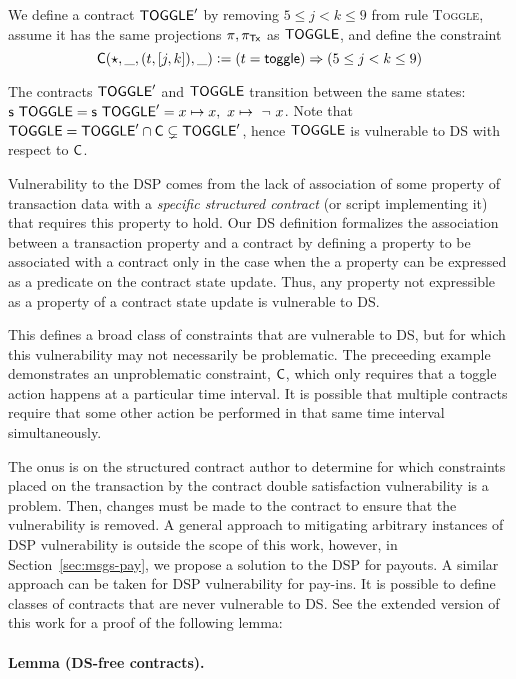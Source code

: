 We define a contract $\mathsf{TOGGLE}'$ by removing $5 \leq j < k \leq 9$ from rule \textsc{Toggle},
assume it has the same projections $\pi, \pi_{\mathsf{Tx}}$ as $\mathsf{TOGGLE}$,
and define the constraint
\[ \mathsf{C} (\star, \_, (t, [j,k]), \_) \mathrel{\mathop:}= (t = \mathsf{toggle}) \Rightarrow (5 \leq j < k \leq 9) \]

The contracts $\mathsf{TOGGLE}'$ and $\mathsf{TOGGLE}$ transition between the same states:
$\mathsf{s}~\mathsf{TOGGLE} = \mathsf{s}~\mathsf{TOGGLE}' = {x \mapsto x,\ x \mapsto ~\neg~x}$.
Note that $\mathsf{TOGGLE} = \mathsf{TOGGLE}' \cap \mathsf{C} \subsetneq \mathsf{TOGGLE}'$, hence
$\mathsf{TOGGLE}$ is vulnerable to DS with respect to $\mathsf{C}$.

Vulnerability to the DSP comes from the lack of association of some property of
transaction data with a \emph{specific structured
contract} (or script implementing it) that requires this property to hold.
Our DS definition formalizes the association between a transaction property and a
contract by defining a property to be associated with a contract only in the case
when the a property can be expressed as a predicate on the contract state update. Thus,
any property not expressible as a property of a contract state update is vulnerable
to DS.

This defines a broad class of constraints
that are vulnerable to DS, but for which this vulnerability may not necessarily be problematic.
The preceeding example demonstrates an unproblematic constraint, $\mathsf{C}$, which only requires
that a toggle action happens at a particular time interval. It is possible that multiple
contracts require that some other action be performed in that same time interval
simultaneously.

The onus is on the structured contract author to determine for which constraints placed on the
transaction by the contract double satisfaction vulnerability is a problem.
Then, changes must be made to the contract to ensure that the vulnerability is
removed. A general approach to mitigating arbitrary instances of DSP vulnerability
is outside the scope of this work, however,
in Section~\ref{sec:msgs-pay}, we propose a solution to the DSP for payouts.
A similar approach can be taken for DSP vulnerability for pay-ins.
It is possible to define classes of contracts that are never vulnerable to DS.
See the extended version of this work for a proof of the following lemma:

\paragraph{Lemma (DS-free contracts). }

